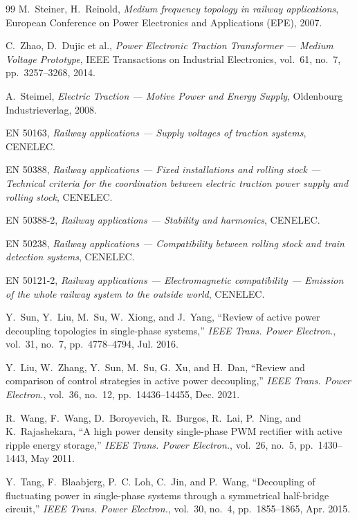 \begin{thebibliography}{99}
 M.~Steiner, H.~Reinold, \emph{Medium frequency topology in railway applications}, European Conference on Power Electronics and Applications (EPE), 2007.

 C.~Zhao, D.~Dujic et al., \emph{Power Electronic Traction Transformer --- Medium Voltage Prototype}, IEEE Transactions on Industrial Electronics, vol.~61, no.~7, pp.~3257--3268, 2014.

 A.~Steimel, \emph{Electric Traction --- Motive Power and Energy Supply}, Oldenbourg Industrieverlag, 2008.

 EN 50163, \emph{Railway applications --- Supply voltages of traction systems}, CENELEC.

 EN 50388, \emph{Railway applications --- Fixed installations and rolling stock --- Technical criteria for the coordination between electric traction power supply and rolling stock}, CENELEC.

 EN 50388-2, \emph{Railway applications --- Stability and harmonics}, CENELEC.

 EN 50238, \emph{Railway applications --- Compatibility between rolling stock and train detection systems}, CENELEC.

 EN 50121-2, \emph{Railway applications --- Electromagnetic compatibility --- Emission of the whole railway system to the outside world}, CENELEC.

 Y.~Sun, Y.~Liu, M.~Su, W.~Xiong, and J.~Yang, ``Review of active power decoupling topologies in single-phase systems,'' \emph{IEEE Trans. Power Electron.}, vol.~31, no.~7, pp.~4778--4794, Jul. 2016.

 Y.~Liu, W.~Zhang, Y.~Sun, M.~Su, G.~Xu, and H.~Dan, ``Review and comparison of control strategies in active power decoupling,'' \emph{IEEE Trans. Power Electron.}, vol.~36, no.~12, pp.~14436--14455, Dec. 2021.

 R.~Wang, F.~Wang, D.~Boroyevich, R.~Burgos, R.~Lai, P.~Ning, and K.~Rajashekara, ``A high power density single-phase PWM rectifier with active ripple energy storage,'' \emph{IEEE Trans. Power Electron.}, vol.~26, no.~5, pp.~1430--1443, May 2011.

 Y.~Tang, F.~Blaabjerg, P.~C. Loh, C.~Jin, and P.~Wang, ``Decoupling of fluctuating power in single-phase systems through a symmetrical half-bridge circuit,'' \emph{IEEE Trans. Power Electron.}, vol.~30, no.~4, pp.~1855--1865, Apr. 2015.


\end{thebibliography}
